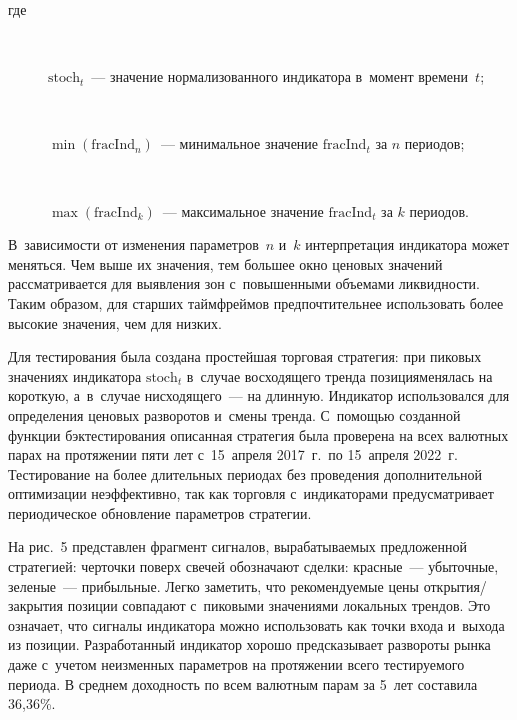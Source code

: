 {\begin{multicols}{2}
$$$$
где 
\begin{description}
\item[\,] $\mathrm{stoch}_t$~--- значение нормализованного индикатора в~момент времени~$t$; 
\item[\,] $\min(\mathrm{fracInd}_n)$~--- минимальное значение $\mathrm{fracInd}_t$ за $n$ периодов; 
 \item[\,] $\max(\mathrm{fracInd}_k)$~--- максимальное значение $\mathrm{fracInd}_t$ за $k$ периодов.
 \end{description}
  В~зависимости от 
изменения параметров~$n$ и~$k$ интерпретация индикатора может меняться. Чем выше их 
значения, тем большее окно ценовых значений рассматривается для выявления зон с~\mbox{повышенными} объемами ликвидности. Таким образом, для старших таймфреймов 
предпочтительнее использовать более высокие значения, чем для низких.

  Для тестирования была создана простейшая торговая стратегия: при пиковых значениях 
индикатора $\mathrm{stoch}_t$ в~случае восходящего тренда позиция\linebreak менялась на короткую, 
а~в~случае нисходящего~--- на длинную. Индикатор использовался для определения 
ценовых разворотов и~смены тренда. \mbox{С~помощью} созданной функции бэктестирования 
описанная стратегия была проверена на всех валютных парах на протяжении пяти лет 
с~15~апреля 2017~г.\ по 15~апреля 2022~г. Тестирование на более длительных периодах без 
проведения дополнительной оптимизации неэффективно, так как торговля с~индикаторами 
предусматривает периодическое обновление параметров стратегии.
  
  На рис.~5 представлен фрагмент сигналов, вырабатываемых предложенной стратегией: 
черточки поверх свечей обозначают сделки: красные~--- убыточные, зеленые~--- 
прибыльные. Легко заметить, что рекомендуемые цены открытия/закрытия позиции 
совпадают с~пиковыми значениями локальных трендов. Это означает, что сигналы 
индикатора можно использовать как точки входа и~выхода из позиции. Разработанный 
индикатор хорошо предсказывает развороты рынка даже с~учетом неизменных параметров 
на протяжении всего тестируемого периода. В среднем доходность по всем валютным парам 
за 5~лет составила 36,36\%.
  

\begin{figure*} %
\vspace*{1pt}
  \begin{center}  
    \mbox{%
\epsfxsize=151.209mm
}

\end{center}
\vspace*{-6pt}
\end{figure*}


\end{multicols}}
